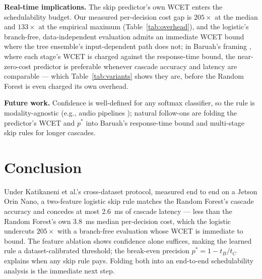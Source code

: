 \documentclass[conference]{IEEEtran}
\begin{document}
\textbf{Real-time implications.} The skip predictor's own WCET enters the schedulability budget. Our measured per-decision cost gap is $205\times$ at the median and $133\times$ at the empirical maximum (Table~\ref{tab:overhead}), and the logistic's branch-free, data-independent evaluation admits an immediate WCET bound where the tree ensemble's input-dependent path does not; in Baruah's framing \cite{baruah2023optimal}, where each stage's WCET is charged against the response-time bound, the near-zero-cost predictor is preferable whenever cascade accuracy and latency are comparable --- which Table~\ref{tab:variants} shows they are, before the Random Forest is even charged its own overhead.

\textbf{Future work.} Confidence is well-defined for any softmax classifier, so the rule is modality-agnostic (e.g., audio pipelines \cite{yantosca2025phonotomizer}); natural follow-ons are folding the predictor's WCET and $p^\ast$ into Baruah's response-time bound and multi-stage skip rules for longer cascades.

\section{Conclusion}
\label{sec:conclusion}

Under Katikaneni et al.'s cross-dataset protocol, measured end to end on a Jetson Orin Nano, a two-feature logistic skip rule matches the Random Forest's cascade accuracy and concedes at most 2.6~ms of cascade latency --- less than the Random Forest's own 3.8~ms median per-decision cost, which the logistic undercuts $205\times$ with a branch-free evaluation whose WCET is immediate to bound. The feature ablation shows confidence alone suffices, making the learned rule a dataset-calibrated threshold; the break-even precision $p^\ast = 1 - t_B/t_C$ explains when any skip rule pays. Folding both into an end-to-end schedulability analysis is the immediate next step.


{\footnotesize

}
\end{document}
